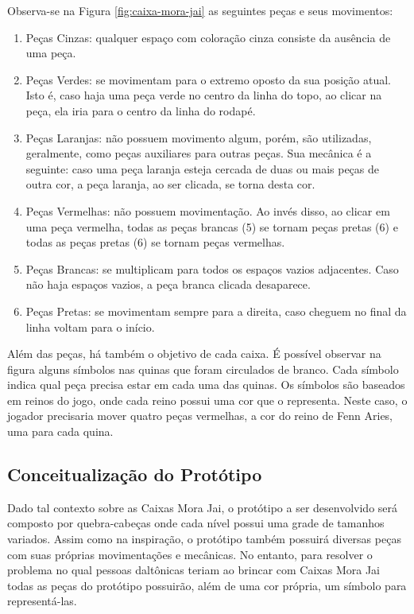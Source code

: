 Observa-se na Figura \ref{fig:caixa-mora-jai} as seguintes peças e seus movimentos:

\begin{enumerate}
	\item Peças Cinzas: qualquer espaço com coloração cinza consiste da ausência de uma peça.
	\item Peças Verdes: se movimentam para o extremo oposto da sua posição atual. Isto é, caso haja uma peça verde no centro da linha do topo, ao clicar na peça, ela iria para o centro da linha do rodapé.
	\item Peças Laranjas: não possuem movimento algum, porém, são utilizadas, geralmente, como peças auxiliares para outras peças. Sua mecânica é a seguinte: caso uma peça laranja esteja cercada de duas ou mais peças de outra cor, a peça laranja, ao ser clicada, se torna desta cor.
	\item Peças Vermelhas: não possuem movimentação. Ao invés disso, ao clicar em uma peça vermelha, todas as peças brancas (5) se tornam peças pretas (6) e todas as peças pretas (6) se tornam peças vermelhas.
	\item Peças Brancas: se multiplicam para todos os espaços vazios adjacentes. Caso não haja espaços vazios, a peça branca clicada desaparece.
	\item Peças Pretas: se movimentam sempre para a direita, caso cheguem no final da linha voltam para o início.
\end{enumerate}

Além das peças, há também o objetivo de cada caixa. É possível observar na figura alguns símbolos nas quinas que foram circulados de branco. Cada símbolo indica qual peça precisa estar em cada uma das quinas. Os símbolos são baseados em reinos do jogo, onde cada reino possui uma cor que o representa. Neste caso, o jogador precisaria mover quatro peças vermelhas, a cor do reino de Fenn Aries, uma para cada quina.

\subsection{Conceitualização do Protótipo}

Dado tal contexto sobre as Caixas Mora Jai, o protótipo a ser desenvolvido será composto por quebra-cabeças onde cada nível possui uma grade de tamanhos variados. Assim como na inspiração, o protótipo também possuirá diversas peças com suas próprias movimentações e mecânicas. No entanto, para resolver o problema no qual pessoas daltônicas teriam ao brincar com Caixas Mora Jai todas as peças do protótipo possuirão, além de uma cor própria, um símbolo para representá-las.

